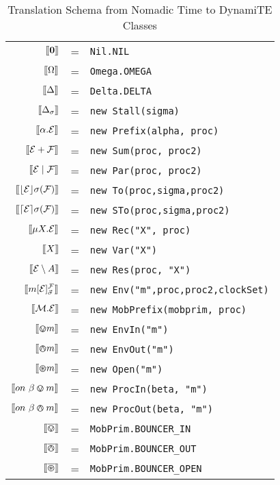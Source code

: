 \begin{table}
 \caption{Translation Schema from Nomadic Time to DynamiTE Classes}
 \label{tab:translationschema}
  \shrule \centering
  \begin{tabular}{rcl}
    $[\hspace{-0.3ex}[ \textbf{0} ]\hspace{-0.3ex}]$ & = & \texttt{Nil.NIL} \\
    $[\hspace{-0.3ex}[ \Omega ]\hspace{-0.3ex}]$ & = & \texttt{Omega.OMEGA} \\
    $[\hspace{-0.3ex}[ \Delta ]\hspace{-0.3ex}]$ & = & \texttt{Delta.DELTA} \\
    $[\hspace{-0.3ex}[ \Delta_{\sigma} ]\hspace{-0.3ex}]$ & = & \texttt{new Stall(sigma)} \\
    $[\hspace{-0.3ex}[ \alpha . \text{$\mathcal{E}$} ]\hspace{-0.3ex}]$ & = & \texttt{new Prefix(alpha, proc)} \\
    $[\hspace{-0.3ex}[ \text{$\mathcal{E}$} + \text{$\mathcal{F}$} ]\hspace{-0.3ex}]$ & = & \texttt{new Sum(proc, proc2)} \\
    $[\hspace{-0.3ex}[ \text{$\mathcal{E}$} \;|\; \text{$\mathcal{F}$} ]\hspace{-0.3ex}]$ & = & \texttt{new Par(proc, proc2)} \\
    $[\hspace{-0.3ex}[ \lfloor{\text{$\mathcal{E}$}}\rfloor {\sigma} ({\text{$\mathcal{F}$}}) ]\hspace{-0.3ex}]$ & = & \texttt{new To(proc,sigma,proc2)} \\
    $[\hspace{-0.3ex}[ \lceil{\text{$\mathcal{E}$}}\rceil {\sigma} ({\text{$\mathcal{F}$}}) ]\hspace{-0.3ex}]$ & = & \texttt{new STo(proc,sigma,proc2)} \\
    $[\hspace{-0.3ex}[ \mu X . \text{$\mathcal{E}$} ]\hspace{-0.3ex}]$ & = & \texttt{new Rec("X", proc)} \\
    $[\hspace{-0.3ex}[ X ]\hspace{-0.3ex}]$ & = & \texttt{new Var("X")} \\
    $[\hspace{-0.3ex}[ \text{$\mathcal{E}$} \setminus {A} ]\hspace{-0.3ex}]$ & = & \texttt{new Res(proc, "X")} \\
    $[\hspace{-0.3ex}[ {m}[ \text{$\mathcal{E}$} ]^{\text{$\mathcal{F}$}}_{\vec{\sigma}} ]\hspace{-0.3ex}]$ & = & \texttt{new Env("m",proc,proc2,clockSet)} \\
    $[\hspace{-0.3ex}[ \text{$\mathcal{M}$} . \text{$\mathcal{E}$} ]\hspace{-0.3ex}]$ & = & \texttt{new MobPrefix(mobprim, proc)} \\
    $[\hspace{-0.3ex}[ \varovee m ]\hspace{-0.3ex}]$ & = & \texttt{new EnvIn("m")} \\
    $[\hspace{-0.3ex}[ \varowedge m ]\hspace{-0.3ex}]$ & = & \texttt{new EnvOut("m")} \\
    $[\hspace{-0.3ex}[ \varoast m ]\hspace{-0.3ex}]$ & = & \texttt{new Open("m")} \\
    $[\hspace{-0.3ex}[ on\ \beta \varovee m ]\hspace{-0.3ex}]$ & = & \texttt{new ProcIn(beta, "m")} \\
    $[\hspace{-0.3ex}[ on\ \beta \varowedge m ]\hspace{-0.3ex}]$ & = & \texttt{new ProcOut(beta, "m")} \\
    $[\hspace{-0.3ex}[ \overline{\varovee} ]\hspace{-0.3ex}]$ & = & \texttt{MobPrim.BOUNCER\_IN} \\
    $[\hspace{-0.3ex}[ \overline{\varowedge} ]\hspace{-0.3ex}]$ & = & \texttt{MobPrim.BOUNCER\_OUT} \\
    $[\hspace{-0.3ex}[ \overline{\varoast} ]\hspace{-0.3ex}]$ & = & \texttt{MobPrim.BOUNCER\_OPEN}
  \end{tabular}
  \shrule
\end{table}


